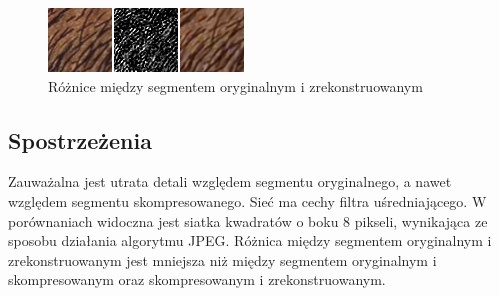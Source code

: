 \documentclass[a4paper, 12pt]{article}
\begin{document}
\begin{figure}[h!]
\begin{center}
	\includegraphics[width=0.85\columnwidth]{orig_vs_rest2.png}
	\caption{Różnice między segmentem oryginalnym i zrekonstruowanym}
\end{center}
\end{figure}
\subsection{Spostrzeżenia}
Zauważalna jest utrata detali względem segmentu oryginalnego, a nawet względem segmentu skompresowanego. Sieć ma cechy filtra uśredniającego.
W porównaniach widoczna jest siatka kwadratów o boku 8 pikseli, wynikająca ze sposobu działania algorytmu JPEG.
Różnica między segmentem oryginalnym i zrekonstruowanym jest mniejsza niż między segmentem oryginalnym i skompresowanym oraz skompresowanym i zrekonstruowanym.
\end{document}
